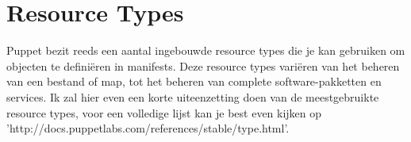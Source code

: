 \chapter{Resource Types}
Puppet bezit reeds een aantal ingebouwde resource types die je kan gebruiken om objecten te defini\"{e}ren in manifests. Deze resource types vari\"{e}ren van het beheren van een bestand of map, tot het beheren van complete software-pakketten en services. Ik zal hier even een korte uiteenzetting doen van de meestgebruikte resource types, voor een volledige lijst kan je best even kijken op 'http://docs.puppetlabs.com/references/stable/type.html'.









%


%


%
%
%
%
%
%
%
%
